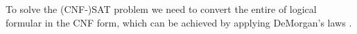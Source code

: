 To solve the (CNF-)SAT problem we need to convert the entire of 
logical formular in the CNF form, 
which can be achieved by applying DeMorgan's laws \cite{enwiki:1184283195}.




